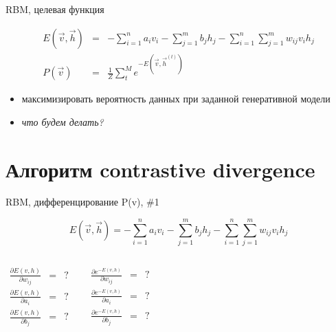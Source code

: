\documentclass[10pt]{beamer}
\begin{document}
\begin{frame}{RBM, целевая функция}

\begin{eqnarray}
E(\vec v, \vec h) &=& -\sum_{i=1}^n a_i v_i - \sum_{j=1}^m b_j h_j - \sum_{i=1}^n \sum_{j=1}^m w_{ij} v_i h_j \\
P(\vec v) &=& \frac{1}{Z} \sum_t^M e^{-E(\vec v, \vec h^{(t)})}
\end{eqnarray}

\begin{itemize}
	\item максимизировать вероятность данных при заданной генеративной модели
	\item \textit{что будем делать?}
\end{itemize}

\end{frame}

\section{Алгоритм contrastive divergence}

\begin{frame}{RBM, дифференцирование P(v), \#1}

\begin{equation*}
E(\vec v, \vec h) = -\sum_{i=1}^n a_i v_i - \sum_{j=1}^m b_j h_j - \sum_{i=1}^n \sum_{j=1}^m w_{ij} v_i h_j
\end{equation*}

\begin{columns}
	
	\begin{eqnarray*}
	\frac{\partial E(v, h)}{\partial w_{ij}} &=& ? \\
	\frac{\partial E(v, h)}{\partial a_{i}} &=& ? \\
	\frac{\partial E(v, h)}{\partial b_{j}} &=& ?
	\end{eqnarray*}	  
    
	
	\begin{eqnarray*}
	\frac{\partial e^{-E(v, h)}}{\partial w_{ij}} &=& ? \\
	\frac{\partial e^{-E(v, h)}}{\partial a_{i}} &=& ? \\
	\frac{\partial e^{-E(v, h)}}{\partial b_{j}} &=& ?
	\end{eqnarray*}
	
\end{columns}

\end{frame}
\end{document}
